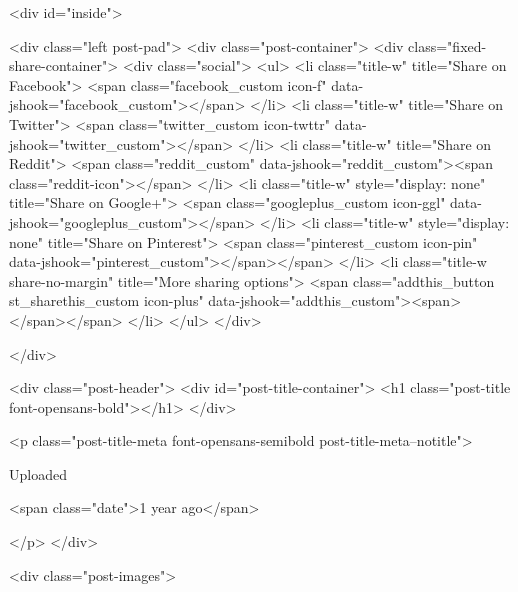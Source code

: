     

        <div id="inside">
        
        <div class="left post-pad">
            <div class="post-container">
                <div class="fixed-share-container">
                    <div class="social">
    <ul>
        <li class="title-w" title="Share on Facebook">
            <span class="facebook_custom icon-f" data-jshook="facebook_custom"></span>
        </li>
        <li class="title-w" title="Share on Twitter">
            <span class="twitter_custom icon-twttr" data-jshook="twitter_custom"></span>
        </li>
        <li class="title-w" title="Share on Reddit">
            <span class="reddit_custom" data-jshook="reddit_custom"><span class="reddit-icon"></span>
        </li>
        <li class="title-w" style="display: none" title="Share on Google+">
            <span class="googleplus_custom icon-ggl" data-jshook="googleplus_custom"></span>
        </li>
        <li class="title-w" style="display: none" title="Share on Pinterest">
            <span class="pinterest_custom icon-pin" data-jshook="pinterest_custom"></span></span>
        </li>
        <li class="title-w share-no-margin" title="More sharing options">
            <span class="addthis_button st_sharethis_custom icon-plus" data-jshook="addthis_custom"><span></span></span>
        </li>
    </ul>
</div>

                </div>

                <div class="post-header">
                    <div id="post-title-container">
                        <h1 class="post-title font-opensans-bold"></h1>
                    </div>

                    <p class="post-title-meta font-opensans-semibold post-title-meta--notitle">
                        

                        
                        
                                                    
                            Uploaded
                        

                                                    <span class="date">1 year ago</span>
                        

                        
                    </p>
                </div>

                <div class="post-images">

                                    
                    

